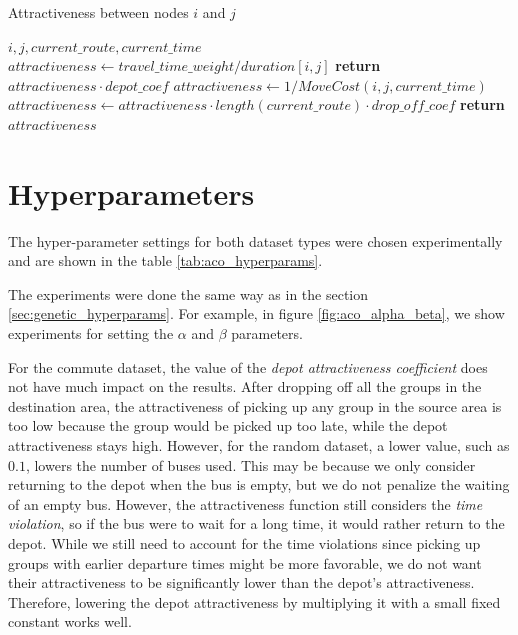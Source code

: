\begin{algorithm}
\caption{Attractiveness between nodes $i$ and $j$}
\begin{algorithmic}
\Require $i, j, current\_route, current\_time$
    \State $attractiveness \gets {travel\_time\_weight} / {duration[i, j]}$ 
    \State \textbf{return} $attractiveness \cdot depot\_coef$ 
\EndIf
\State $attractiveness \gets 1 / MoveCost(i, j, current\_time)$  
    \State $attractiveness \gets attractiveness \cdot length(current\_route) \cdot drop\_off\_coef$
\EndIf
\State \textbf{return} $attractiveness$
\end{algorithmic}
\end{algorithm}

\section{Hyperparameters}\label{sec:aco_hyperparams}

The hyper-parameter settings for both dataset types were chosen experimentally and are shown in the table \ref{tab:aco_hyperparams}. 

The experiments were done the same way as in the section \ref{sec:genetic_hyperparams}. For example, in figure \ref{fig:aco_alpha_beta}, we show experiments for setting the $\alpha$ and $\beta$ parameters.

For the commute dataset, the value of the \textit{depot attractiveness coefficient} does not have much impact on the results. After dropping off all the groups in the destination area, the attractiveness of picking up any group in the source area is too low because the group would be picked up too late, while the depot attractiveness stays high. However, for the random dataset, a lower value, such as $0.1$, lowers the number of buses used. This may be because we only consider returning to the depot when the bus is empty, but we do not penalize the waiting of an empty bus. However, the attractiveness function still considers the \textit{time violation}, so if the bus were to wait for a long time, it would rather return to the depot. While we still need to account for the time violations since picking up groups with earlier departure times might be more favorable, we do not want their attractiveness to be significantly lower than the depot's attractiveness. Therefore, lowering the depot attractiveness by multiplying it with a small fixed constant works well.

